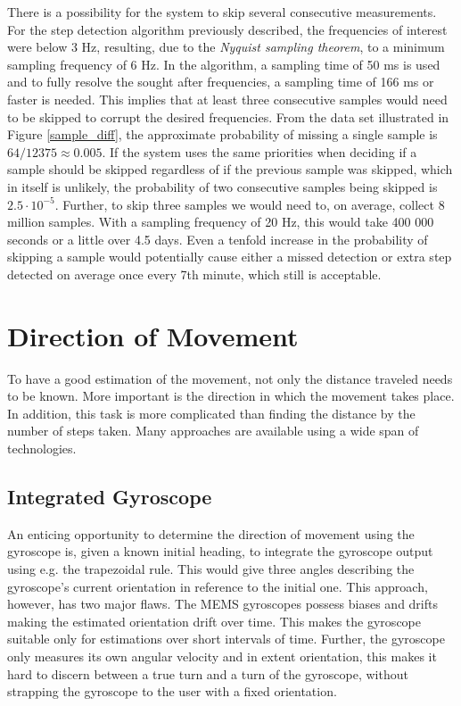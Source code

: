 \documentclass{LTHthesis}
\begin{document}
There is a possibility for the system to skip several consecutive measurements. For the step detection algorithm previously described, the frequencies of interest were below 3 Hz, resulting, due to the \emph{Nyquist sampling theorem}, to a minimum sampling frequency of 6 Hz. In the algorithm, a sampling time of  50 ms is used and to fully resolve the sought after frequencies, a sampling time of 166 ms or faster is needed. This implies that at least three consecutive samples would need to be skipped to corrupt the desired frequencies. From the data set illustrated in Figure \ref{sample_diff}, the approximate probability of missing a single sample is $64/12375\approx0.005$. If the system uses the same priorities when deciding if a sample should be skipped regardless of if the previous sample was skipped, which in itself is unlikely, the probability of two consecutive samples being skipped is $2.5\cdot10^{-5}$. Further, to skip three samples we would need to, on average, collect 8 million samples. With a sampling frequency of 20 Hz, this would take 400 000 seconds or a little over 4.5 days. Even a tenfold increase in the probability of skipping a sample would potentially cause either a missed detection or extra step detected on average once every 7th minute, which still is acceptable.              
%

\section{Direction of Movement}
%
To have a good estimation of the movement, not only the distance traveled needs to be known. More important is the direction in which the movement takes place. In addition, this task is more complicated than finding the distance by the number of steps taken. Many approaches are available using a wide span of technologies. 
%
\subsection{Integrated Gyroscope}
%
An enticing opportunity to determine the direction of movement using the gyroscope is, given a known initial heading, to integrate the gyroscope output using e.g. the trapezoidal rule. This would give three angles describing the gyroscope's current orientation in reference to the initial one. This approach, however, has two major flaws. The MEMS gyroscopes possess biases and drifts making the estimated orientation drift over time. This makes the gyroscope suitable only for estimations over short intervals of time. Further, the gyroscope only measures its own angular velocity and in extent orientation, this makes it hard to discern between a true turn and a turn of the gyroscope, without strapping the gyroscope to the user with a fixed orientation. 
\end{document}
